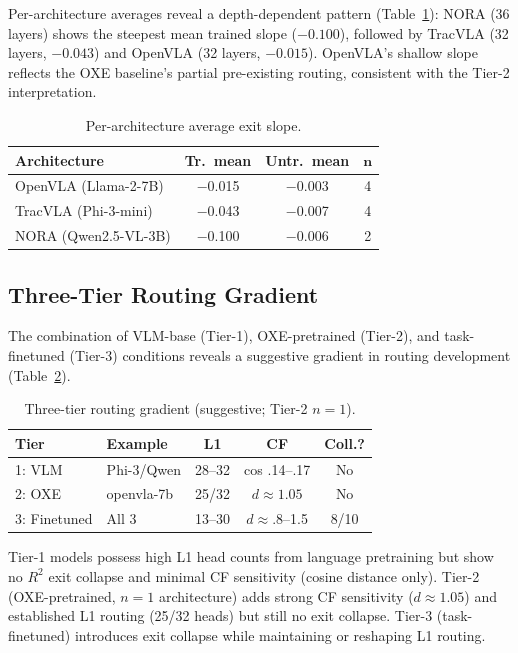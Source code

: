 \documentclass[10pt,twocolumn]{article}
\begin{document}
Per-architecture averages reveal a depth-dependent pattern (Table~\ref{tab:arch_slope}): NORA (36 layers) shows the steepest mean trained slope ($-0.100$), followed by TracVLA (32 layers, $-0.043$) and OpenVLA (32 layers, $-0.015$). OpenVLA's shallow slope reflects the OXE baseline's partial pre-existing routing, consistent with the Tier-2 interpretation.

\begin{table}[t]
\centering
\caption{Per-architecture average exit slope.}
\label{tab:arch_slope}
\small
\begin{tabular}{@{}lccc@{}}
\toprule
\textbf{Architecture} & \textbf{Tr.\ mean} & \textbf{Untr.\ mean} & $\boldsymbol{n}$ \\
\midrule
OpenVLA (Llama-2-7B) & $-$0.015 & $-$0.003 & 4 \\
TracVLA (Phi-3-mini) & $-$0.043 & $-$0.007 & 4 \\
NORA (Qwen2.5-VL-3B) & $-$0.100 & $-$0.006 & 2 \\
\bottomrule
\end{tabular}
\end{table}

\subsection{Three-Tier Routing Gradient}
\label{sec:threetier}

The combination of VLM-base (Tier-1), OXE-pretrained (Tier-2), and task-finetuned (Tier-3) conditions reveals a suggestive gradient in routing development (Table~\ref{tab:threetier}).

\begin{table}[t]
\centering
\caption{Three-tier routing gradient (suggestive; Tier-2 $n=1$).}
\label{tab:threetier}
\footnotesize
\setlength{\tabcolsep}{3pt}
\begin{tabular}{@{}llccc@{}}
\toprule
\textbf{Tier} & \textbf{Example} & \textbf{L1} & \textbf{CF} & \textbf{Coll.?} \\
\midrule
1: VLM & Phi-3/Qwen & 28--32 & cos .14--.17 & No \\
2: OXE & openvla-7b & 25/32 & $d\!\approx\!1.05$ & No \\
3: Finetuned & All 3 & 13--30 & $d\!\approx\!.8$--1.5 & 8/10 \\
\bottomrule
\end{tabular}
\end{table}

Tier-1 models possess high L1 head counts from language pretraining but show no $R^2$ exit collapse and minimal CF sensitivity (cosine distance only). Tier-2 (OXE-pretrained, $n=1$ architecture) adds strong CF sensitivity ($d \approx 1.05$) and established L1 routing (25/32 heads) but still no exit collapse. Tier-3 (task-finetuned) introduces exit collapse while maintaining or reshaping L1 routing.
\end{document}
